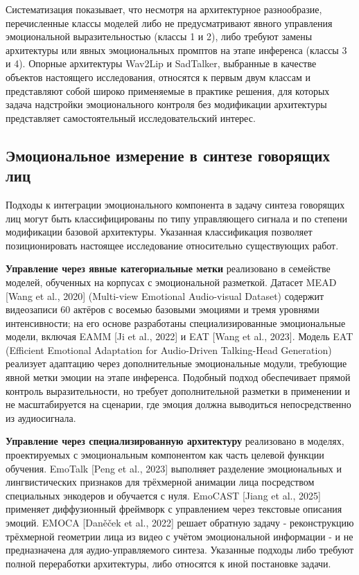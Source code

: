 \documentclass[a4paper, 12pt, oneside, openany]{article}
\begin{document}
Систематизация показывает, что несмотря на архитектурное разнообразие, перечисленные классы моделей либо не предусматривают явного управления эмоциональной выразительностью (классы 1 и 2), либо требуют замены архитектуры или явных эмоциональных промптов на этапе инференса (классы 3 и 4). Опорные архитектуры Wav2Lip и SadTalker, выбранные в качестве объектов настоящего исследования, относятся к первым двум классам и представляют собой широко применяемые в практике решения, для которых задача надстройки эмоционального контроля без модификации архитектуры представляет самостоятельный исследовательский интерес.

\subsection{Эмоциональное измерение в синтезе говорящих лиц}

Подходы к интеграции эмоционального компонента в задачу синтеза говорящих лиц могут быть классифицированы по типу управляющего сигнала и по степени модификации базовой архитектуры. Указанная классификация позволяет позиционировать настоящее исследование относительно существующих работ.

\textbf{Управление через явные категориальные метки} реализовано в семействе моделей, обученных на корпусах с эмоциональной разметкой. Датасет MEAD [Wang et al., 2020] (Multi-view Emotional Audio-visual Dataset) содержит видеозаписи 60 актёров с восемью базовыми эмоциями и тремя уровнями интенсивности; на его основе разработаны специализированные эмоциональные модели, включая EAMM [Ji et al., 2022] и EAT [Wang et al., 2023]. Модель EAT (Efficient Emotional Adaptation for Audio-Driven Talking-Head Generation) реализует адаптацию через дополнительные эмоциональные модули, требующие явной метки эмоции на этапе инференса. Подобный подход обеспечивает прямой контроль выразительности, но требует дополнительной разметки в применении и не масштабируется на сценарии, где эмоция должна выводиться непосредственно из аудиосигнала.

\textbf{Управление через специализированную архитектуру} реализовано в моделях, проектируемых с эмоциональным компонентом как часть целевой функции обучения. EmoTalk [Peng et al., 2023] выполняет разделение эмоциональных и лингвистических признаков для трёхмерной анимации лица посредством специальных энкодеров и обучается с нуля. EmoCAST [Jiang et al., 2025] применяет диффузионный фреймворк с управлением через текстовые описания эмоций. EMOCA [Daněček et al., 2022] решает обратную задачу - реконструкцию трёхмерной геометрии лица из видео с учётом эмоциональной информации - и не предназначена для аудио-управляемого синтеза. Указанные подходы либо требуют полной переработки архитектуры, либо относятся к иной постановке задачи.
\end{document}
